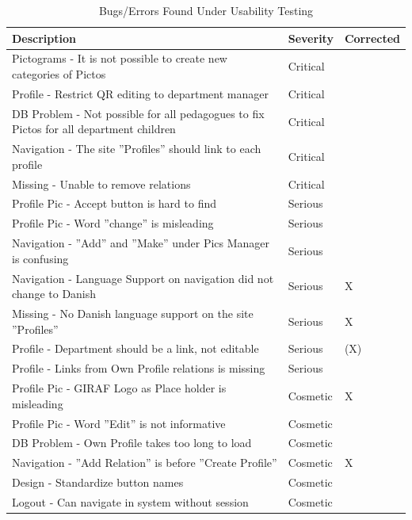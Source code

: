\begin{table}[htbp]
	\centering
		\begin{tabularx}{\textwidth}{|X|l|l|}
			\hline
			Description & Severity & Corrected\\\hline\hline
			Pictograms - It is not possible to create new categories of Pictos & Critical &\\\hline
			Profile - Restrict QR editing to department manager & Critical &  \\\hline 
			DB Problem - Not possible for all pedagogues to fix Pictos for all department children & Critical & \\\hline
			Navigation - The site ''Profiles'' should link to each profile & Critical &\\\hline
			Missing - Unable to remove relations & Critical & \\\hline
			Profile Pic - Accept button is hard to find & Serious &\\\hline
			Profile Pic - Word ''change'' is misleading & Serious &\\\hline
			Navigation - ''Add'' and ''Make'' under Pics Manager is confusing & Serious & \\\hline
			Navigation - Language Support on navigation did not change to Danish & Serious & X\\\hline
			Missing - No Danish language support on the site ''Profiles''& Serious & X\\\hline
			Profile - Department should be a link, not editable & Serious & (X)\\\hline
			Profile - Links from Own Profile relations is missing & Serious & \\\hline
			Profile Pic - GIRAF Logo as Place holder is misleading  & Cosmetic & X\\\hline
			Profile Pic - Word ''Edit'' is not informative & Cosmetic &\\\hline
			DB Problem - Own Profile takes too long to load & Cosmetic &  \\\hline
			Navigation - ''Add Relation''  is before ''Create Profile'' & Cosmetic & X \\\hline
			Design - Standardize button names & Cosmetic & \\\hline
			Logout - Can navigate in system without session & Cosmetic & \\\hline
	\end{tabularx}
	\caption{Bugs/Errors Found Under Usability Testing}
	\label{tab:Bugs/Errors}
\end{table}

